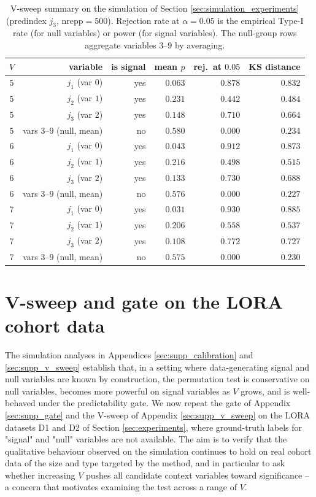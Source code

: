 \documentclass[AMA,Times1COL]{WileyNJDv5} %
\begin{document}
\begin{table}[ht]
\centering
\small
\begin{tabular}{c r r r r r}
\toprule
$V$ & variable & is signal & mean $p$ & rej.\ at $0.05$ & KS distance \\
\midrule
$5$ & $j_1$ (var $0$) & yes & $0.063$ & $0.878$ & $0.832$ \\
$5$ & $j_2$ (var $1$) & yes & $0.231$ & $0.442$ & $0.484$ \\
$5$ & $j_3$ (var $2$) & yes & $0.148$ & $0.710$ & $0.664$ \\
$5$ & vars $3$--$9$ (null, mean) & no & $0.580$ & $0.000$ & $0.234$ \\
\midrule
$6$ & $j_1$ (var $0$) & yes & $0.043$ & $0.912$ & $0.873$ \\
$6$ & $j_2$ (var $1$) & yes & $0.216$ & $0.498$ & $0.515$ \\
$6$ & $j_3$ (var $2$) & yes & $0.133$ & $0.730$ & $0.688$ \\
$6$ & vars $3$--$9$ (null, mean) & no & $0.576$ & $0.000$ & $0.227$ \\
\midrule
$7$ & $j_1$ (var $0$) & yes & $0.031$ & $0.930$ & $0.885$ \\
$7$ & $j_2$ (var $1$) & yes & $0.206$ & $0.558$ & $0.537$ \\
$7$ & $j_3$ (var $2$) & yes & $0.108$ & $0.772$ & $0.727$ \\
$7$ & vars $3$--$9$ (null, mean) & no & $0.575$ & $0.000$ & $0.230$ \\
\bottomrule
\end{tabular}
\caption{V-sweep summary on the simulation of Section \ref{sec:simulation_experiments} (predindex $j_3$, $\mathrm{nrepp}=500$). Rejection rate at $\alpha=0.05$ is the empirical Type-I rate (for null variables) or power (for signal variables). The null-group rows aggregate variables $3$--$9$ by averaging.}
\label{tab:supp_v_sweep}
\end{table}

\section{V-sweep and gate on the LORA cohort data}\label{sec:supp_lora}

The simulation analyses in Appendices \ref{sec:supp_calibration} and \ref{sec:supp_v_sweep} establish that, in a setting where data-generating signal and null variables are known by construction, the permutation test is conservative on null variables, becomes more powerful on signal variables as $V$ grows, and is well-behaved under the predictability gate. We now repeat the gate of Appendix \ref{sec:supp_gate} and the V-sweep of Appendix \ref{sec:supp_v_sweep} on the LORA datasets D1 and D2 of Section \ref{sec:experiments}, where ground-truth labels for "signal" and "null" variables are not available. The aim is to verify that the qualitative behaviour observed on the simulation continues to hold on real cohort data of the size and type targeted by the method, and in particular to ask whether increasing $V$ pushes all candidate context variables toward significance -- a concern that motivates examining the test across a range of $V$.
\end{document}

